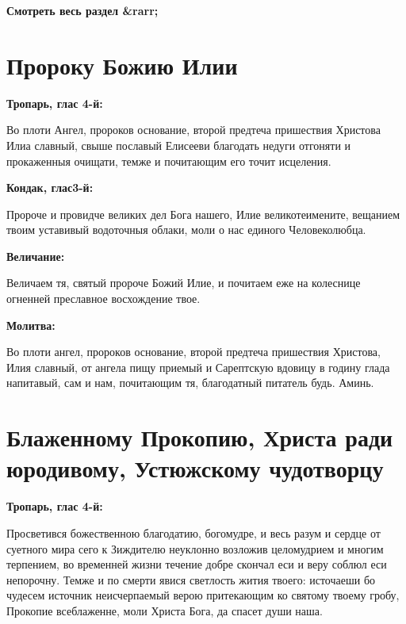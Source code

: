 \mychapterending


\bfseries Смотреть весь раздел &rarr;\normalfont{} 

\section{Пророку Божию Илии}
 

\bfseries Тропарь, глас 4-й:\normalfont{}


Во плоти Ангел, пророков основание, второй предтеча пришествия Христова Илиа славный, свыше пославый Елисееви благодать недуги отгоняти и прокаженныя очищати, темже и почитающим его точит исцеления.


\medskip


\bfseries Кондак, глас3-й:\normalfont{}


Пророче и провидче великих дел Бога нашего, Илие великотеимените, вещанием твоим уставивый водоточныя облаки, моли о нас единого Человеколюбца.


\medskip


\bfseries Величание:\normalfont{}


Величаем тя, святый пророче Божий Илие, и почитаем еже на колеснице огненней преславное восхождение твое.


\medskip


\bfseries Молитва:\normalfont{}


Во плоти ангел, пророков основание, второй предтеча пришествия Христова, Илия славный, от ангела пищу приемый и Сарептскую вдовицу в годину глада напитавый, сам и нам, почитающим тя, благодатный питатель будь. Аминь.


\section{Блаженному Прокопию, Христа ради юродивому, Устюжскому  чудотворцу}
 


\bfseries Тропарь, глас 4-й:\normalfont{}


Просветився божественною благодатию, богомудре, и весь разум и сердце от суетного мира сего к Зиждителю неуклонно возложив целомудрием и многим терпением, во временней жизни течение добре скончал еси и веру соблюл еси непорочну. Темже и по смерти явися светлость жития твоего: источаеши бо чудесем источник неисчерпаемый верою притекающим ко святому твоему гробу, Прокопие всеблаженне, моли Христа Бога, да спасет души наша.


